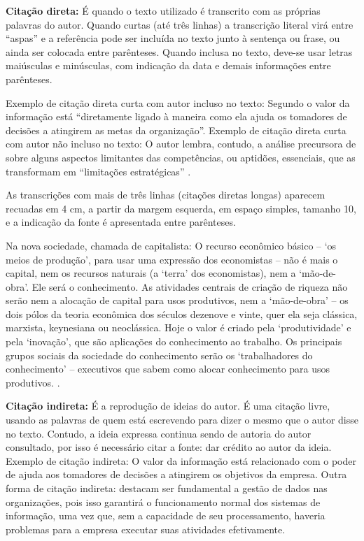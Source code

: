 \textbf{Citação direta:} É quando o texto utilizado é transcrito com as próprias palavras do autor. Quando curtas (até três linhas) a transcrição literal virá entre “aspas” e a referência pode ser incluída no texto junto à sentença ou frase, ou ainda ser colocada entre parênteses. Quando inclusa no texto, deve-se usar letras maiúsculas e minúsculas, com indicação da data e demais informações entre parênteses.

Exemplo de citação direta curta com autor incluso no texto: Segundo  o valor da informação está “diretamente ligado à maneira como ela ajuda os tomadores de decisões a atingirem as metas da organização”. Exemplo de citação direta curta com autor não incluso no texto: O autor lembra, contudo, a análise precursora de  sobre alguns aspectos limitantes das competências, ou aptidões, essenciais, que as transformam em “limitações estratégicas” \cite{Pressman2009}.

As transcrições com mais de três linhas (citações diretas longas) aparecem recuadas em 4 cm, a partir da margem esquerda, em espaço simples, tamanho 10, e a indicação da fonte é apresentada entre parênteses. 

\begin{citacao}
Na nova sociedade, chamada de capitalista: O recurso econômico básico – ‘os meios de produção’, para usar uma expressão dos economistas – não é mais o capital, nem os recursos naturais (a ‘terra’ dos economistas), nem a ‘mão-de-obra’. Ele será o conhecimento. As atividades centrais de criação de riqueza não serão nem a alocação de capital para usos produtivos, nem a ‘mão-de-obra’ – os dois pólos da teoria econômica dos séculos dezenove e vinte, quer ela seja clássica, marxista, keynesiana ou neoclássica. Hoje o valor é criado pela ‘produtividade’ e pela ‘inovação’, que são aplicações do conhecimento ao trabalho. Os principais grupos sociais da sociedade do conhecimento serão os ‘trabalhadores do conhecimento’ – executivos que sabem como alocar conhecimento para usos produtivos. \cite[p. 48]{Pressman2009}.
\end{citacao}

\textbf{Citação indireta:} É a reprodução de ideias do autor. É uma citação livre, usando as palavras de quem está escrevendo para dizer o mesmo que o autor disse no texto. Contudo, a ideia expressa continua sendo de autoria do autor consultado, por isso é necessário citar a fonte: dar crédito ao autor da ideia. Exemplo de citação indireta: O valor da informação está relacionado com o poder de ajuda aos tomadores de decisões a atingirem os objetivos da empresa\cite{Pressman2009}. Outra forma de citação indireta:  destacam ser fundamental a gestão de dados nas organizações, pois isso garantirá o funcionamento normal dos sistemas de informação, uma vez que, sem a capacidade de seu processamento, haveria problemas para a empresa executar suas atividades efetivamente.

